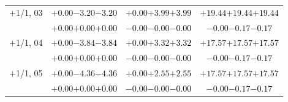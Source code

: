 \documentclass[compress]{beamer}
\begin{document}
\begin{frame}
\begin{tabular}{r | c | c | c}
$+$1/1, 03 & $+0.00$\hspace{0.1 cm}$-3.20$\hspace{0.1 cm}\textcolor{black}{$-3.20$} & $+0.00$\hspace{0.1 cm}$+3.99$\hspace{0.1 cm}\textcolor{black}{$+3.99$} & $+19.44$\hspace{0.1 cm}$+19.44$\hspace{0.1 cm}\textcolor{black}{$+19.44$} \\
           & $+0.00$\hspace{0.1 cm}$+0.00$\hspace{0.1 cm}\textcolor{black}{$+0.00$} & $-0.00$\hspace{0.1 cm}$-0.00$\hspace{0.1 cm}\textcolor{black}{$-0.00$} & $-0.00$\hspace{0.1 cm}$-0.17$\hspace{0.1 cm}\textcolor{black}{$-0.17$} \\
$+$1/1, 04 & $+0.00$\hspace{0.1 cm}$-3.84$\hspace{0.1 cm}\textcolor{black}{$-3.84$} & $+0.00$\hspace{0.1 cm}$+3.32$\hspace{0.1 cm}\textcolor{black}{$+3.32$} & $+17.57$\hspace{0.1 cm}$+17.57$\hspace{0.1 cm}\textcolor{black}{$+17.57$} \\
           & $+0.00$\hspace{0.1 cm}$+0.00$\hspace{0.1 cm}\textcolor{black}{$+0.00$} & $-0.00$\hspace{0.1 cm}$-0.00$\hspace{0.1 cm}\textcolor{black}{$-0.00$} & $-0.00$\hspace{0.1 cm}$-0.17$\hspace{0.1 cm}\textcolor{black}{$-0.17$} \\
$+$1/1, 05 & $+0.00$\hspace{0.1 cm}$-4.36$\hspace{0.1 cm}\textcolor{black}{$-4.36$} & $+0.00$\hspace{0.1 cm}$+2.55$\hspace{0.1 cm}\textcolor{black}{$+2.55$} & $+17.57$\hspace{0.1 cm}$+17.57$\hspace{0.1 cm}\textcolor{black}{$+17.57$} \\
           & $+0.00$\hspace{0.1 cm}$+0.00$\hspace{0.1 cm}\textcolor{black}{$+0.00$} & $-0.00$\hspace{0.1 cm}$-0.00$\hspace{0.1 cm}\textcolor{black}{$-0.00$} & $-0.00$\hspace{0.1 cm}$-0.17$\hspace{0.1 cm}\textcolor{black}{$-0.17$} \\

\end{tabular}
\end{frame}
\end{document}
